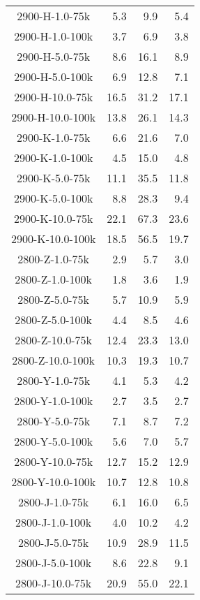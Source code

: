 \begin{longtable}{crrr}
    2900-H-1.0-75k   &    5.3 &    9.9 &    5.4 \\
    2900-H-1.0-100k  &    3.7 &    6.9 &    3.8 \\
    2900-H-5.0-75k   &    8.6 &   16.1 &    8.9 \\
    2900-H-5.0-100k  &    6.9 &   12.8 &    7.1 \\
    2900-H-10.0-75k  &   16.5 &   31.2 &   17.1 \\
    2900-H-10.0-100k &   13.8 &   26.1 &   14.3 \\
    2900-K-1.0-75k   &    6.6 &   21.6 &    7.0 \\
    2900-K-1.0-100k  &    4.5 &   15.0 &    4.8 \\
    2900-K-5.0-75k   &   11.1 &   35.5 &   11.8 \\
    2900-K-5.0-100k  &    8.8 &   28.3 &    9.4 \\
    2900-K-10.0-75k  &   22.1 &   67.3 &   23.6 \\
    2900-K-10.0-100k &   18.5 &   56.5 &   19.7 \\
    2800-Z-1.0-75k   &    2.9 &    5.7 &    3.0 \\
    2800-Z-1.0-100k  &    1.8 &    3.6 &    1.9 \\
    2800-Z-5.0-75k   &    5.7 &   10.9 &    5.9 \\
    2800-Z-5.0-100k  &    4.4 &    8.5 &    4.6 \\
    2800-Z-10.0-75k  &   12.4 &   23.3 &   13.0 \\
    2800-Z-10.0-100k &   10.3 &   19.3 &   10.7 \\
    2800-Y-1.0-75k   &    4.1 &    5.3 &    4.2 \\
    2800-Y-1.0-100k  &    2.7 &    3.5 &    2.7 \\
    2800-Y-5.0-75k   &    7.1 &    8.7 &    7.2 \\
    2800-Y-5.0-100k  &    5.6 &    7.0 &    5.7 \\
    2800-Y-10.0-75k  &   12.7 &   15.2 &   12.9 \\
    2800-Y-10.0-100k &   10.7 &   12.8 &   10.8 \\
    2800-J-1.0-75k   &    6.1 &   16.0 &    6.5 \\
    2800-J-1.0-100k  &    4.0 &   10.2 &    4.2 \\
    2800-J-5.0-75k   &   10.9 &   28.9 &   11.5 \\
    2800-J-5.0-100k  &    8.6 &   22.8 &    9.1 \\
    2800-J-10.0-75k  &   20.9 &   55.0 &   22.1 \\

\end{longtable}
